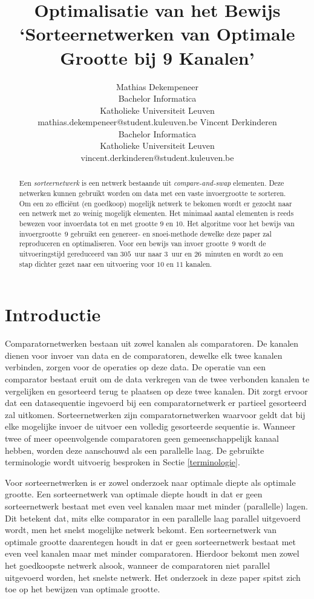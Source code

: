 \documentclass{article}
\title{Optimalisatie van het Bewijs\\ `Sorteernetwerken van Optimale Grootte bij 9 Kanalen'}
\author{Mathias Dekempeneer\\Bachelor Informatica\\Katholieke Universiteit Leuven \\mathias.dekempeneer@student.kuleuven.be
\And
Vincent Derkinderen\\Bachelor Informatica\\Katholieke Universiteit Leuven \\vincent.derkinderen@student.kuleuven.be}
\begin{document}
\maketitle

\begin{abstract}
Een \textit{sorteernetwerk} is een netwerk bestaande uit \textit{compare-and-swap} elementen.
Deze netwerken kunnen gebruikt worden om data met een vaste invoergrootte te sorteren.
Om een zo effici\"ent (en goedkoop) mogelijk netwerk te bekomen wordt er gezocht naar een netwerk met zo weinig mogelijk elementen.
Het minimaal aantal elementen is reeds bewezen voor invoerdata tot en met grootte $9$ en $10$.
Het algoritme voor het bewijs van invoergrootte~$9$ \cite{sortingNetworksSize2014} gebruikt een genereer- en snoei-methode dewelke deze paper zal reproduceren en optimaliseren.
Voor een bewijs van invoer grootte~$9$ wordt de uitvoeringstijd gereduceerd van $305$~uur naar $3$~uur en {$26$~minuten} en wordt zo een stap dichter gezet naar een uitvoering voor $10$ en $11$ kanalen.
\end{abstract}


\section{Introductie}
Comparatornetwerken bestaan uit zowel kanalen als comparatoren.
De kanalen dienen voor invoer van data en de comparatoren, dewelke elk twee kanalen verbinden, zorgen voor de operaties op deze data.
De operatie van een comparator bestaat eruit om de data verkregen van de twee verbonden kanalen te vergelijken en gesorteerd terug te plaatsen op deze twee kanalen.
Dit zorgt ervoor dat een datasequentie ingevoerd bij een comparatornetwerk er partieel gesorteerd zal uitkomen.
Sorteernetwerken zijn comparatornetwerken waarvoor geldt dat bij elke mogelijke invoer de uitvoer een volledig gesorteerde sequentie is.
Wanneer twee of meer opeenvolgende comparatoren geen gemeenschappelijk kanaal hebben, worden deze aanschouwd als een parallelle laag.
De gebruikte terminologie wordt uitvoerig besproken in Sectie \ref{terminologie}.

Voor sorteernetwerken is er zowel onderzoek naar optimale diepte als optimale grootte.
Een sorteernetwerk van optimale diepte houdt in dat er geen sorteernetwerk bestaat met even veel kanalen maar met minder (parallelle) lagen.
Dit betekent dat, mits elke comparator in een parallelle laag parallel uitgevoerd wordt, men het snelst mogelijke netwerk bekomt.
Een sorteernetwerk van optimale grootte daarentegen houdt in dat er geen sorteernetwerk bestaat met even veel kanalen maar met minder comparatoren.
Hierdoor bekomt men zowel het goedkoopste netwerk alsook, wanneer de comparatoren niet parallel uitgevoerd worden, het snelste netwerk.
Het onderzoek in deze paper spitst zich toe op het bewijzen van optimale grootte.
\end{document}

